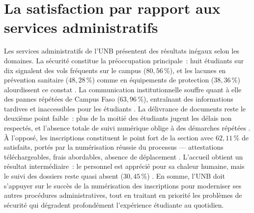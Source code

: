 \documentclass[
12pt,          %
a4paper,       %
oneside,      %
openright      %
]{report}          %
\begin{document}
		\section{La satisfaction par rapport aux services administratifs}
		Les services administratifs de l'UNB pr\'esentent
		des r\'esultats in\'egaux selon les domaines.
		La s\'ecurit\'e constitue la pr\'eoccupation principale~:
		huit \'etudiants sur dix signalent des vols fr\'equents
		sur le campus ($80{,}56\,\%$), et les lacunes en
		pr\'evention sanitaire ($48{,}28\,\%$) comme en
		\'equipements de protection ($38{,}36\,\%$) alourdissent
		ce constat \citep{pascarella1991how}. La communication
		institutionnelle souffre quant \`a elle des pannes
		r\'ep\'et\'ees de Campus Faso ($63{,}96\,\%$), entra\^inant
		des informations tardives et inaccessibles pour les
		\'etudiants \citep{wiers2002student}. La d\'elivrance
		de documents reste le deuxi\`eme point faible~: plus
		de la moiti\'e des \'etudiants jugent les d\'elais non
		respect\'es, et l'absence totale de suivi num\'erique
		oblige \`a des d\'emarches r\'ep\'et\'ees \citep{elliott2002}.
		\`A l'oppos\'e, les inscriptions constituent le point
		fort de la section avec $62{,}11\,\%$ de satisfaits,
		port\'es par la num\'erisation r\'eussie du processus
		--- attestations t\'el\'echargeables, frais abordables,
		absence de d\'eplacement \citep{hill1995measuring}.
		L'accueil obtient un r\'esultat interm\'ediaire~: le
		personnel est appr\'eci\'e pour sa chaleur humaine,
		mais le suivi des dossiers reste quasi absent
		($30{,}45\,\%$) \citep{aldridge1998}.
		En somme, l'UNB doit s'appuyer sur le succ\`es de
		la num\'erisation des inscriptions pour moderniser
		ses autres proc\'edures administratives, tout en
		traitant en priorit\'e les probl\`emes de s\'ecurit\'e
		qui d\'egradent profond\'ement l'exp\'erience
		\'etudiante au quotidien.
		
\end{document}
